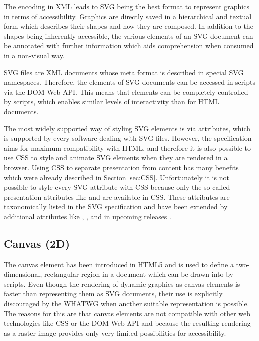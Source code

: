 The encoding in XML leads to SVG being the best format to represent graphics in terms of accessibility. 
Graphics are directly saved in a hierarchical and textual form which describes their shapes and how they are composed. 
In addition to the shapes being inherently accessible, the various elements of an SVG document can be annotated with further information which aids comprehension when consumed in a non-visual way.

SVG files are XML documents whose meta format is described in special SVG namespaces. 
Therefore, the elements of SVG documents can be accessed in scripts via the DOM Web API. 
This means that elements can be completely controlled by scripts, which enables similar levels of interactivity than for HTML documents.

The most widely supported way of styling SVG elements is via attributes, which is supported by every software dealing with SVG files. 
However, the specification aims for maximum compatibility with HTML, and therefore it is also possible to use CSS to style and animate SVG elements when they are rendered in a browser. 
Using CSS to separate presentation from content has many benefits which were already described in Section \ref{sec:CSS}.
Unfortunately it is not possible to style every SVG attribute with CSS because only the so-called presentation attributes like  and  are available in CSS. 
These attributes are taxonomically listed in the SVG specification \parencite{SVG11} and have been extended by additional attributes like , ,  and  in upcoming releases \parencite{SVG2}.

\subsection{Canvas (2D)}
\label{sec:Canvas2D}

The canvas element has been introduced in HTML5 \parencite{HTML} and is used to define a two-dimensional, rectangular region in a document which can be drawn into by scripts.
Even though the rendering of dynamic graphics as canvas elements is faster than representing them as SVG documents, their use is explicitly discouraged by the WHATWG when another suitable representation is possible.
The reasons for this are that canvas elements are not compatible with other web technologies like CSS or the DOM Web API and because the resulting rendering as a raster image provides only very limited possibilities for accessibility.


